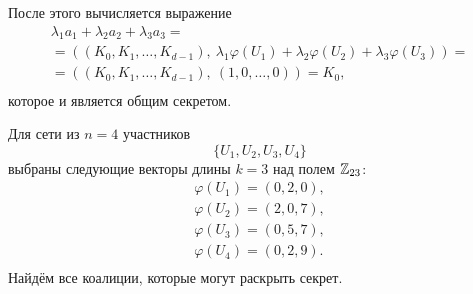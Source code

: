 После этого вычисляется выражение
\[\begin{array}{l}
    \lambda_1 a_1 + \lambda_2 a_2 + \lambda_3 a_3 = \\
    = \left( \left( K_0, K_1, \dots, K_{d-1} \right), ~ \lambda_1 \varphi(U_1) + \lambda_2 \varphi(U_2) + \lambda_3 \varphi(U_3) \right) = \\
    = \left( \left( K_0, K_1, \dots, K_{d-1} \right), ~ \left( 1, 0, \dots, 0 \right) \right) =  K_0, \\
\end{array}\]
которое и является общим секретом.

%
%
%
%

\example
Для сети из $n=4$ участников
    \[ \{ U_1, U_2, U_3, U_4 \} \]
выбраны следующие векторы длины $k=3$ над полем $\mathbb{Z}_{23}$:
\[ \begin{array}{l}
    \varphi(U_1) = (0,2,0), \\
    \varphi(U_2) = (2,0,7), \\
    \varphi(U_3) = (0,5,7), \\
    \varphi(U_4) = (0,2,9). \\
\end{array} \]
Найдём все коалиции, которые могут раскрыть секрет.

